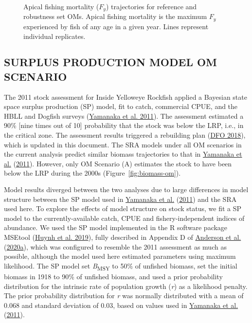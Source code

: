 \documentclass[11pt]{book}
\begin{document}
\begin{figure}[htb]

{\centering {} 

}

\caption{Apical fishing mortality (\(F_y\)) trajectories for reference and robustness set OMs. Apical fishing mortality is the maximum \(F_y\) experienced by fish of any age in a given year. Lines represent individual replicates.}\label{fig:F-om}
\end{figure}
\clearpage

\hypertarget{surplus-production-model-om-scenario}{%
\subsection{SURPLUS PRODUCTION MODEL OM SCENARIO}\label{surplus-production-model-om-scenario}}

The 2011 stock assessment for Inside Yelloweye Rockfish applied a Bayesian state space surplus production (SP) model, fit to catch, commercial CPUE, and the HBLL and Dogfish surveys (\protect\hyperlink{ref-yamanaka2011}{Yamanaka et al. 2011}). The assessment estimated a 90\% {[}nine times out of 10{]} probability that the stock was below the LRP, i.e., in the critical zone. The assessment results triggered a rebuilding plan (\protect\hyperlink{ref-ifmp2018}{DFO 2018}), which is updated in this document. The SRA models under all OM scenarios in the current analysis predict similar biomass trajectories to that in \protect\hyperlink{ref-yamanaka2011}{Yamanaka et al.} (\protect\hyperlink{ref-yamanaka2011}{2011}). However, only OM Scenario (A) estimates the stock to have been below the LRP during the 2000s (Figure~\ref{fig:biomass-om}).

Model results diverged between the two analyses due to large differences in model structure between the SP model used in \protect\hyperlink{ref-yamanaka2011}{Yamanaka et al.} (\protect\hyperlink{ref-yamanaka2011}{2011}) and the SRA used here. To explore the effects of model structure on stock status, we fit a SP model to the currently-available catch, CPUE and fishery-independent indices of abundance. We used the SP model implemented in the R software package MSEtool (\protect\hyperlink{ref-huynh_msetool_2019}{Huynh et al. 2019}), fully described in Appendix D of \protect\hyperlink{ref-anderson2020gfmp}{Anderson et al.} (\protect\hyperlink{ref-anderson2020gfmp}{2020a}), which was configured to resemble the 2011 assessment as much as possible, although the model used here estimated parameters using maximum likelihood. The SP model set \emph{B}\textsubscript{MSY} to 50\% of unfished biomass, set the initial biomass in 1918 to 90\% of unfished biomass, and used a prior probability distribution for the intrinsic rate of population growth (\emph{r}) as a likelihood penalty. The prior probability distribution for \emph{r} was normally distributed with a mean of 0.068 and standard deviation of 0.03, based on values used in \protect\hyperlink{ref-yamanaka2011}{Yamanaka et al.} (\protect\hyperlink{ref-yamanaka2011}{2011}).
\end{document}
